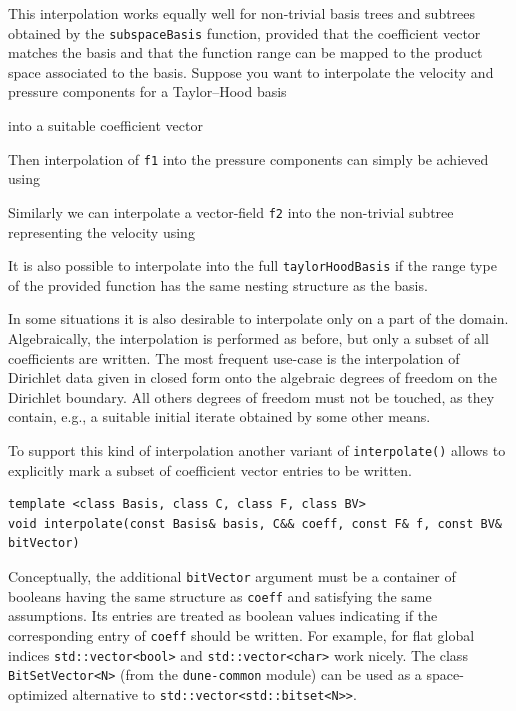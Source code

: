 \documentclass[a4paper,10pt,headings=normal,bibliography=totoc]{scrartcl}
\newcommand{\cpp}[1]{\lstinline[basicstyle=\ttfamily]!#1!}
\newcommand{\dunemodule}[1]{\texttt{#1}}
\begin{document}
This interpolation works equally well for non-trivial basis trees
and subtrees obtained by the \cpp{subspaceBasis} function,
provided that the coefficient vector matches the basis
and that the function range can be mapped to the product space
associated to the basis.
Suppose you want to interpolate
the velocity and pressure components for a Taylor--Hood basis
%

%
into a suitable coefficient vector
%

%
Then interpolation of \cpp{f1} into the pressure components can simply
be achieved using
%

%
Similarly we can interpolate a vector-field \cpp{f2}
into the non-trivial subtree representing the velocity using
%

%
It is also possible to interpolate into the full \cpp{taylorHoodBasis}
if the range type of the provided function has the same nesting structure
as the basis.


In some situations it is also desirable to interpolate only on a part of the domain.  Algebraically, the interpolation
is performed as before, but only a subset of all coefficients are written.  The most frequent use-case is the interpolation
of Dirichlet data given in closed form onto the algebraic degrees of freedom on the Dirichlet boundary.  All others
degrees of freedom must not be touched, as they contain, e.g., a suitable initial iterate obtained by some other
means.

To support this kind of interpolation another variant of
\cpp{interpolate()} allows to explicitly mark a subset of
coefficient vector entries to be written.
\begin{lstlisting}[style=Interface]
template <class Basis, class C, class F, class BV>
void interpolate(const Basis& basis, C&& coeff, const F& f, const BV& bitVector)
\end{lstlisting}
Conceptually, the additional \cpp{bitVector}
argument must be a container of booleans having
the same structure as \cpp{coeff} and satisfying
the same assumptions.  Its entries are treated as boolean
values indicating if the corresponding entry of \cpp{coeff}
should be written.
For example, for flat global indices \cpp{std::vector<bool>} and
\cpp{std::vector<char>} work nicely.
The class \cpp{BitSetVector<N>} (from the \dunemodule{dune-common} module) can be used
as a space-optimized alternative to \cpp{std::vector<std::bitset<N>>}.
\end{document}
